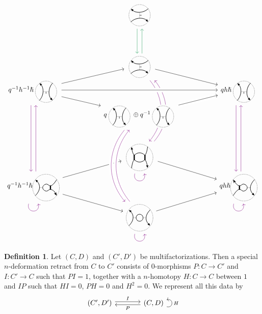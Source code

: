 \documentclass{article}
\newcommand{\sdr}[5]{%
  \begin{tikzcd}[column sep=large, ampersand replacement=\&]
    {#1} \arrow[r, "#3", shift left=0.5ex,] \arrow[r, leftarrow, "#4", shift right=0.5ex, swap] \& 
    {#2} \arrow[loop right, distance=1em, in=15, out=-15, "#5",swap]
  \end{tikzcd}%
}
\theoremstyle{plain} %
\theoremstyle{definition} %
\newtheorem{definition}[theorem]{Definition}
\theoremstyle{remark} %
\begin{document}
\[\label{r2bsdr}
\begin{tikzcd}[row sep=-0.1cm, column sep=2cm]
	&
	\scalebox{0.7}{\UnorientedVerticalThinEdge{}{}{}{}}
	\arrow[d, color=ForestGreen, shift right=1.5]
	&
	\\[4em]&
	\scalebox{0.7}{\UnorientedVerticalThinEdge{}{}{}{}}
	\arrow[dr]
	\arrow[ddd, bend left=40, color=violet, shift right=1.5, dash pattern=on 40pt off 35pt]
	\arrow[leftarrow, ddd, bend left=40, color=violet, shift left=1.5, dash pattern=on 39.5pt off 37pt]
	\arrow[u, color=ForestGreen, shift right=1.5]
	&
	\\
	q^{-1}h^{-1}\hslash\scalebox{0.7}{\UnorientedHorizontalThinEdge{}{}{}{}} 
	\arrow[dr]
	\arrow[ur]
	\arrow[ddd, color=violet, shift right=1.5]
	&
	&
	qh\hslash\scalebox{0.7}{\UnorientedHorizontalThinEdge{}{}{}{}}
	\arrow[ddd, color=violet, shift right=1.5]
	\\
	& 
	q\scalebox{0.7}{\UnorientedHorizontalThinEdge{}{}{}{}}\oplus q^{-1}\scalebox{0.7}{\UnorientedHorizontalThinEdge{}{}{}{}}
	\arrow[ur, crossing over] 
	&
	\\[2em]
	& 
	\scalebox{0.7}{\Square{}{}{}{}{}{}}
	\arrow[loop right, distance=1.5em, in=-75, out=-105, color=violet]
	\arrow[dr]
	&
	\\
	q^{-1}h^{-1}\hslash\scalebox{0.7}{\ThinThickUnoriented{}{}{}{}{}} 
	\arrow[loop right, distance=1.5em, in=-75, out=-105, color=violet]
	\arrow[ur]
	\arrow[dr]
	\arrow[uuu, color=violet, shift right=1.5]
	&& 
	qh\hslash\scalebox{0.7}{\ThickThinUnoriented{}{}{}{}{}}
	\arrow[uuu, color=violet, shift right=1.5]
	\arrow[loop right, distance=1.5em, in=-75, out=-105, color=violet]
	\\
	& 
	\scalebox{0.7}{\ThinThinUnoriented{}{}{}{}{}} 
	\arrow[ur]
	\arrow[loop right, distance=1.5em, in=-75, out=-105, color=violet] 
	&
	\arrow[ddd, from=4-2, to=7-2, bend right=40, crossing over, color=violet, shift right=1.5] 
	\arrow[uuu, from=7-2, to=4-2, bend left=40, crossing over, color=violet, shift right=1.5] 
	\arrow[ur, from=4-2, to=3-3, crossing over] 
	\arrow[rr, from=3-1, to=3-3, crossing over] 
\end{tikzcd}
\]


\begin{definition}
Let $(C,D)$ and $(C',D')$ be multifactorizations. Then a special $n$-deformation retract from $C$ to $C'$ consists of 0-morphisms $P:C\to C'$ and $I:C'\to C$ such that $PI=1$, together with a $n$-homotopy $H:C\to C$ between $1$ and $IP$ such that $HI=0$, $PH=0$ and $H^2=0$. We represent all this data by
$$\sdr{(C',D')}{(C,D)}{I}{P}{H}$$
\end{definition}
\end{document}
